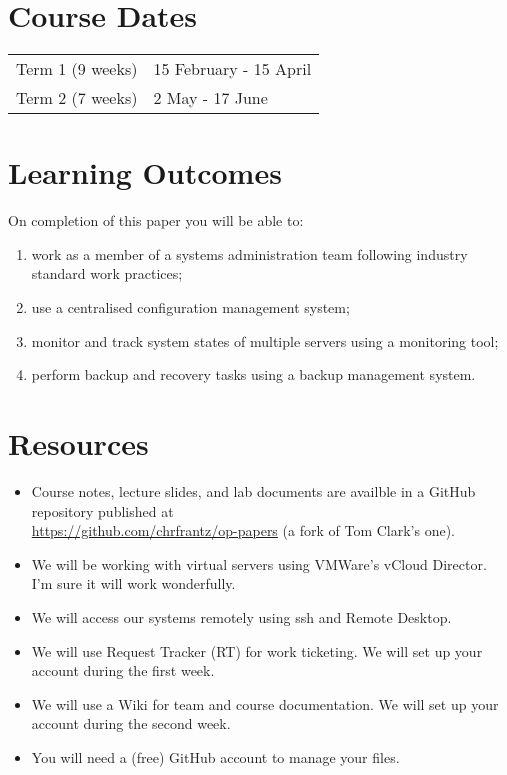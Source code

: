 \documentclass{article}
\begin{document}
\section*{Course Dates}
\begin{tabular}{ll}
Term 1 (9 weeks) & 15 February - 15 April\\
Term 2 (7 weeks) & 2 May - 17 June\\
\end{tabular}

\newpage 

\section*{Learning Outcomes}
On completion of this paper you will be able to:
\begin{enumerate}
  \item work as a member of a systems administration team following industry standard work practices;
  \item use a centralised configuration management system;
  \item monitor and track system states of multiple servers using a monitoring tool;
  \item perform backup and recovery tasks using a backup management system.
\end{enumerate}

\section*{Resources}
\begin{itemize}
	\item Course notes, lecture slides, and lab documents are availble in a GitHub repository published at \\ \url{https://github.com/chrfrantz/op-papers} (a fork of Tom Clark's one).
	\item We will be working with virtual servers using VMWare's vCloud Director. I'm sure it will work wonderfully.
	\item We will access our systems remotely using ssh and Remote Desktop.
	\item We will use Request Tracker (RT) for work ticketing. We will set up your account during the first week.
	\item We will use a Wiki for team and course documentation. We will set up your account during the second week.
	\item You will need a (free) GitHub account to manage your files.
\end{itemize}
\end{document}

